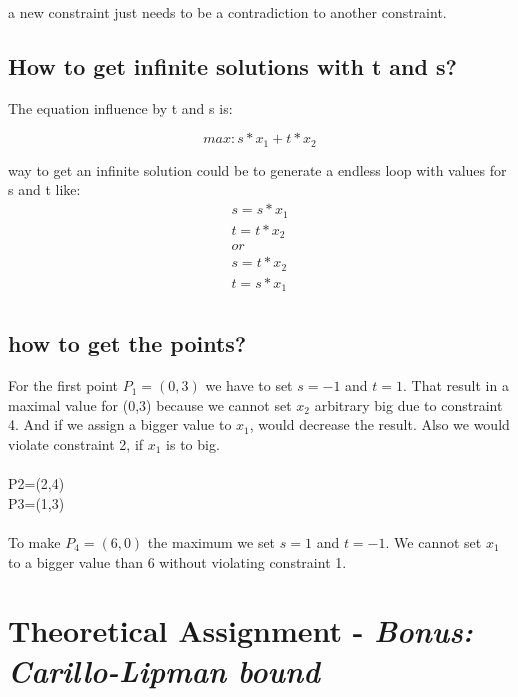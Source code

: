 \documentclass[%
   10pt,              %
   nenglish,           %
   a4paper,           %
   DIV11,             %
]{scrartcl}%
\begin{document}
\noindent a new constraint just needs to be a contradiction to another constraint.
	
\subsection*{How to get infinite solutions with t and s?}
The equation influence by t and s is:

\begin{equation*}
max: s*x_1+t*x_2
\end{equation*}

\noindent way to get an infinite solution could be to generate a endless loop with values for s and t like:
\begin{eqnarray*}
s=s*x_1\label{inf1}\\ 
t=t*x_2 \label{inf2}\\ 
or\\
s=t*x_2\label{inf3}\\ 
t=s*x_1 \label{inf4}\\ 
\end{eqnarray*}


\subsection*{how to get the points?}

For the first point $P_1=(0,3)$ we have to set $s = -1$ and $t = 1$. That result in a maximal value 
for (0,3) because we cannot set $x_2$ arbitrary big due to constraint 4. And if we assign a bigger 
value to $x_1$, would decrease the result. Also we would violate constraint 2, if $x_1$ is to big.\\
\\
P2=(2,4)\\
P3=(1,3)\\
\\
\noindent To make $P_4=(6,0)$ the maximum we set $s = 1$ and $t = -1$. We cannot set $x_1$ to a bigger value 
than 6 without violating constraint 1.

\section*{Theoretical Assignment - \textsl{Bonus: Carillo-Lipman bound}}

%
%
 
\end{document}
